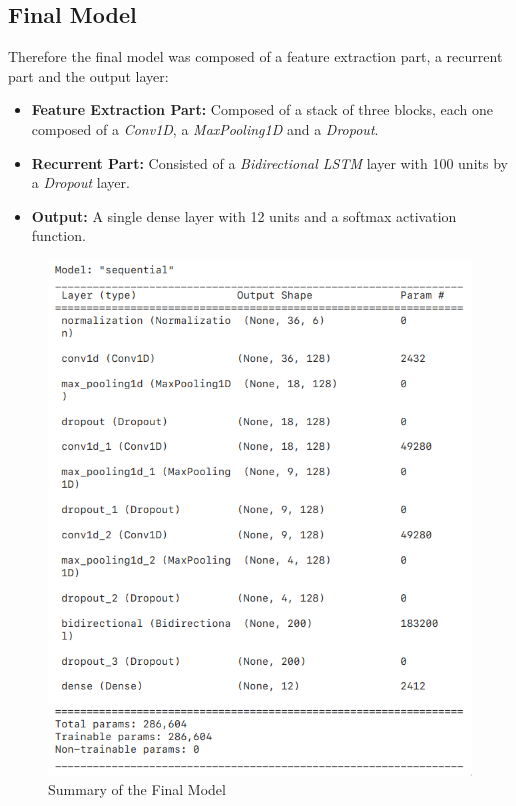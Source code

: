 \documentclass[11pt]{article}
\begin{document}
\subsection*{Final Model}
Therefore the final model was composed of a feature extraction part, a recurrent part and the output layer:
\begin{itemize}
	\item\textbf{Feature Extraction Part:} Composed of a stack of three blocks, each one composed of a \emph{Conv1D}, a \emph{MaxPooling1D} and a \emph{Dropout}.
	\item\textbf{Recurrent Part:} Consisted of a \emph{Bidirectional LSTM} layer with 100 units by a \emph{Dropout} layer.
	\item\textbf{Output:} A single dense layer with 12 units and a softmax activation function.
\end{itemize}


\begin{figure}[H]
\center
	\includegraphics[scale=0.35]{model_summary.png}
	\caption{Summary of the Final Model}
\end{figure}
\end{document}
